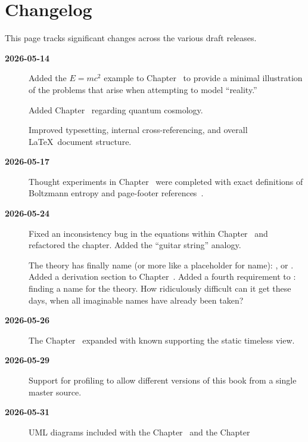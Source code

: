 \section*{Changelog}

This page tracks significant changes across the various draft releases.

\begin{description}

\item[\textbf{2026-05-14}]
  Added the $E=mc^2$ example to Chapter~ to provide a
  minimal illustration of the problems that arise when attempting to model
  ``reality.''
  
  Added Chapter~ regarding quantum cosmology.
  
  Improved typesetting, internal cross-referencing, and overall
  \LaTeX\ document structure.
  
\item[\textbf{2026-05-17}]
  Thought experiments in Chapter~ 
  were completed with exact definitions of Boltzmann entropy and page-footer references~\cite{page1983clock}.

\item[\textbf{2026-05-24}]
  Fixed an inconsistency bug in the equations within Chapter~ and refactored
  the chapter. Added the ``guitar string'' analogy.

  The theory has finally name (or more like a placeholder for name): \iame, or \iameverything.
  Added a derivation section to Chapter~.
  Added a fourth requirement to : finding a name for the theory. How
  ridiculously difficult can it get these days, when all imaginable names have already been taken?

\item[\textbf{2026-05-26}]

  The Chapter~ expanded with known
  supporting the static timeless view.

\item[\textbf{2026-05-29}]
  Support for profiling to allow different versions of this book from a single master source.

\item[\textbf{2026-05-31}]
  UML diagrams included with the Chapter~
  and the Chapter~


\end{description}
